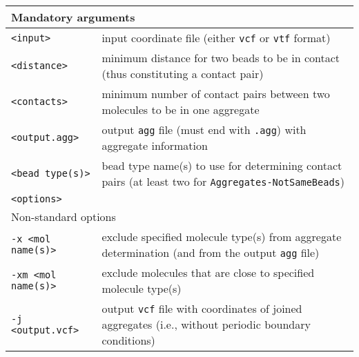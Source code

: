 \vspace{1em}
\noindent
\begin{longtable}{p{}p{}}
  \toprule
  \multicolumn{2}{l}{Mandatory arguments} \\
  \midrule
  \texttt{<input>} & input coordinate file (either \texttt{vcf} or
    \texttt{vtf} format) \\
  \texttt{<distance>} & minimum distance for two beads to be in contact
    (thus constituting a contact pair) \\
  \texttt{<contacts>} & minimum number of contact pairs between two
    molecules to be in one aggregate \\
  \texttt{<output.agg>} & output \texttt{agg} file (must end with
    \texttt{.agg}) with aggregate information \\
  \texttt{<bead type(s)>} & bead type name(s) to use for determining
    contact pairs (at least two for \texttt{Aggregates-NotSameBeads}) \\
  \texttt{<options>} & \\
  \toprule
  \multicolumn{2}{l}{Non-standard options} \\
  \midrule
  \texttt{-x <mol name(s)>} & exclude specified molecule type(s) from
    aggregate determination (and from the output \texttt{agg} file) \\
  \texttt{-xm <mol name(s)>} & exclude molecules that are close to
    specified molecule type(s) \\
  \texttt{-j <output.vcf>} & output \texttt{vcf} file with coordinates of
    joined aggregates (i.e., without periodic boundary conditions) \\
  \bottomrule
\end{longtable}

